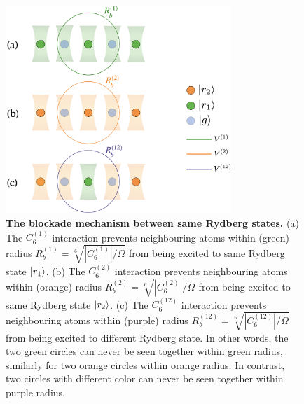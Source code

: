 \documentclass[%
 reprint,
nofootinbib,
 amsmath,amssymb,
 aps,
pra,
floatfix,
]{revtex4-2}
\begin{document}
\begin{figure}[ht!]
    \centering
    \includegraphics[width=8.5cm]{picture/Blockade_Mech.png}
    \caption{\textbf{The blockade mechanism between same Rydberg states.} (a) The $C^{(1)}_6$ interaction prevents neighbouring atoms within (green) radius $R^{(1)}_b = \sqrt[6]{|C^{(1)}_6|/\Omega}$ from being excited to same Rydberg state $\ket{r_1}$. (b) The $C^{(2)}_6$ interaction prevents neighbouring atoms within (orange) radius $R^{(2)}_b = \sqrt[6]{|C^{(2)}_6|/\Omega}$ from being excited to same Rydberg state $\ket{r_2}$. (c) The $C^{(12)}_6$ interaction prevents neighbouring atoms within (purple) radius $R^{(12)}_b = \sqrt[6]{|C^{(12)}_6|/\Omega}$ from being excited to different Rydberg state. In other words, the two green circles can never be seen together within green radius, similarly for two orange circles within orange radius. In contrast, two circles with different color can never be seen together within purple radius.}
    \label{fig:blockade}
\end{figure}\\
\end{document}

